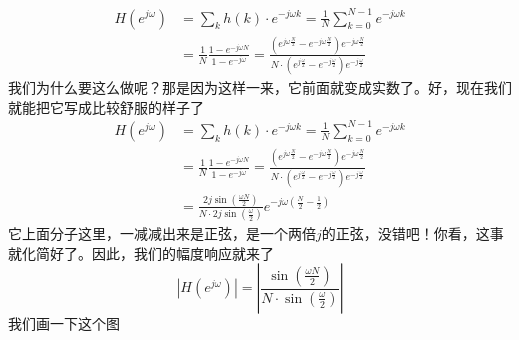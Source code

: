 \documentclass[a4paper,12pt]{article}
\begin{document}
\begin{equation}
\begin{aligned}
   H\left (  e^{j\omega} \right ) &= \sum_k h(k)\cdot e^{-j\omega k} = \frac{1}{N}\sum_{k=0}^{N-1}e^{-j \omega k}\\
&=\frac{1}{N}\frac{1-e^{-j\omega N}}{1-e^{-j\omega }}=\frac{\left ( e^{j\omega \frac{N}{2}}-e^{-j\omega \frac{N}{2}} \right ) e^{-j\omega \frac{N}{2}}}{N\cdot \left ( e^{j \frac{\omega}{2}}-e^{-j\frac{\omega}{2}} \right ) e^{-j \frac{\omega}{2}}}
\end{aligned}
\end{equation}
我们为什么要这么做呢？那是因为这样一来，它前面就变成实数了。好，现在我们就能把它写成比较舒服的样子了
\begin{equation}
\begin{aligned}
   H\left (  e^{j\omega} \right ) &= \sum_k h(k)\cdot e^{-j\omega k} = \frac{1}{N}\sum_{k=0}^{N-1}e^{-j \omega k}\\
&=\frac{1}{N}\frac{1-e^{-j\omega N}}{1-e^{-j\omega }}=\frac{\left ( e^{j\omega \frac{N}{2}}-e^{-j\omega \frac{N}{2}} \right ) e^{-j\omega \frac{N}{2}}}{N\cdot \left ( e^{j \frac{\omega}{2}}-e^{-j\frac{\omega}{2}} \right ) e^{-j \frac{\omega}{2}}}\\
&=\frac{2j\sin\left ( \frac{\omega N}{2}\right ) }{N\cdot 2j\sin\left ( \frac{\omega }{2}\right )}e^{-j\omega \left ( \frac{N}{2}- \frac{1}{2}\right )}
\end{aligned}
\end{equation}
它上面分子这里，一减减出来是正弦，是一个两倍$j$的正弦，没错吧！你看，这事就化简好了。因此，我们的幅度响应就来了
\begin{equation}
   \left |  H\left (  e^{j\omega} \right ) \right | = \left |  \frac{\sin\left ( \frac{\omega N}{2}\right ) }{N\cdot \sin\left ( \frac{\omega }{2}\right )} \right |
\end{equation}
我们画一下这个图
\end{document}
